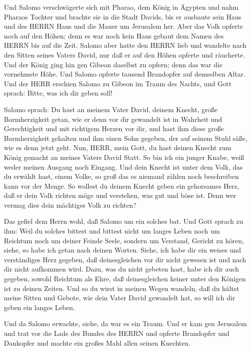  Und Salomo verschwägerte sich mit Pharao, dem König in
Ägypten und nahm Pharaos Tochter und brachte sie in die Stadt Davids,
bis er ausbaute sein Haus und des HERRN Haus und die Mauer um Jerusalem
her.  Aber das Volk opferte noch auf den Höhen; denn es war
noch kein Haus gebaut dem Namen des HERRN bis auf die Zeit. 
Salomo aber hatte den HERRN lieb und wandelte nach den Sitten seines
Vaters David, nur daß er auf den Höhen opferte und räucherte.
 Und der König ging hin gen Gibeon daselbst zu opfern; denn
das war die vornehmste Höhe. Und Salomo opferte tausend Brandopfer auf
demselben Altar.  Und der HERR erschien Salomo zu Gibeon im
Traum des Nachts, und Gott sprach: Bitte, was ich dir geben soll!

 Salomo sprach: Du hast an meinem Vater David, deinem
Knecht, große Barmherzigkeit getan, wie er denn vor dir gewandelt ist in
Wahrheit und Gerechtigkeit und mit richtigem Herzen vor dir, und hast
ihm diese große Barmherzigkeit gehalten und ihm einen Sohn gegeben, der
auf seinem Stuhl säße, wie es denn jetzt geht.  Nun, HERR,
mein Gott, du hast deinen Knecht zum König gemacht an meines Vaters
David Statt. So bin ich ein junger Knabe, weiß weder meinen Ausgang noch
Eingang.  Und dein Knecht ist unter dem Volk, das du erwählt
hast, einem Volke, so groß das es niemand zählen noch beschreiben kann
vor der Menge.  So wollest du deinem Knecht geben ein
gehorsames Herz, daß er dein Volk richten möge und verstehen, was gut
und böse ist. Denn wer vermag dies dein mächtiges Volk zu richten?

 Das gefiel dem Herrn wohl, daß Salomo um ein solches bat.
 Und Gott sprach zu ihm: Weil du solches bittest und
bittest nicht um langes Leben noch um Reichtum noch um deiner Feinde
Seele, sondern um Verstand, Gericht zu hören,  siehe, so
habe ich getan nach deinen Worten. Siehe, ich habe dir ein weises und
verständiges Herz gegeben, daß deinesgleichen vor dir nicht gewesen ist
und nach dir nicht aufkommen wird.  Dazu, was du nicht
gebeten hast, habe ich dir auch gegeben, sowohl Reichtum als Ehre, daß
deinesgleichen keiner unter den Königen ist zu deinen Zeiten.
 Und so du wirst in meinen Wegen wandeln, daß du hältst
meine Sitten und Gebote, wie dein Vater David gewandelt hat, so will ich
dir geben ein langes Leben.

 Und da Salomo erwachte, siehe, da war es ein Traum. Und er
kam gen Jerusalem und trat vor die Lade des Bundes des HERRN und opferte
Brandopfer und Dankopfer und machte ein großes Mahl allen seinen
Knechten.

